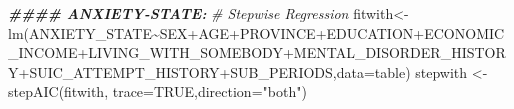 \documentclass[
]{book}
\newenvironment{Shaded}{\begin{snugshade}}{\end{snugshade}}
\newcommand{\AttributeTok}[1]{\textcolor[rgb]{0.77,0.63,0.00}{#1}}
\newcommand{\CommentTok}[1]{\textcolor[rgb]{0.56,0.35,0.01}{\textit{#1}}}
\newcommand{\ConstantTok}[1]{\textcolor[rgb]{0.00,0.00,0.00}{#1}}
\newcommand{\DocumentationTok}[1]{\textcolor[rgb]{0.56,0.35,0.01}{\textbf{\textit{#1}}}}
\newcommand{\FunctionTok}[1]{\textcolor[rgb]{0.00,0.00,0.00}{#1}}
\newcommand{\NormalTok}[1]{#1}
\newcommand{\OtherTok}[1]{\textcolor[rgb]{0.56,0.35,0.01}{#1}}
\newcommand{\SpecialCharTok}[1]{\textcolor[rgb]{0.00,0.00,0.00}{#1}}
\newcommand{\StringTok}[1]{\textcolor[rgb]{0.31,0.60,0.02}{#1}}
\begin{document}
\begin{Shaded}
\begin{Highlighting}[]
\DocumentationTok{\#\#\#\# ANXIETY{-}STATE:}
\CommentTok{\# Stepwise Regression}
\NormalTok{fitwith}\OtherTok{\textless{}{-}}\FunctionTok{lm}\NormalTok{(ANXIETY\_STATE}\SpecialCharTok{\textasciitilde{}}\NormalTok{SEX}\SpecialCharTok{+}\NormalTok{AGE}\SpecialCharTok{+}\NormalTok{PROVINCE}\SpecialCharTok{+}\NormalTok{EDUCATION}\SpecialCharTok{+}\NormalTok{ECONOMIC\_INCOME}\SpecialCharTok{+}\NormalTok{LIVING\_WITH\_SOMEBODY}\SpecialCharTok{+}\NormalTok{MENTAL\_DISORDER\_HISTORY}\SpecialCharTok{+}\NormalTok{SUIC\_ATTEMPT\_HISTORY}\SpecialCharTok{+}\NormalTok{SUB\_PERIODS,}\AttributeTok{data=}\NormalTok{table)}
\NormalTok{stepwith }\OtherTok{\textless{}{-}} \FunctionTok{stepAIC}\NormalTok{(fitwith, }\AttributeTok{trace=}\ConstantTok{TRUE}\NormalTok{,}\AttributeTok{direction=}\StringTok{"both"}\NormalTok{)}
\end{Highlighting}
\end{Shaded}
\end{document}
